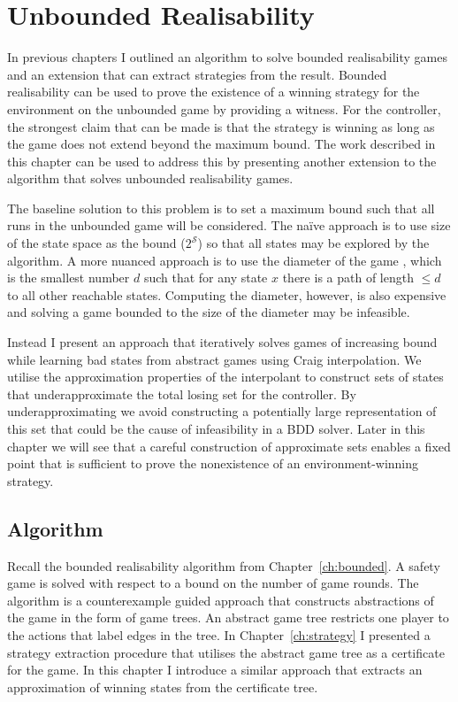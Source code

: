 \chapter{Unbounded Realisability}
\label{ch:unbounded}

\newtheorem*{exmpInt}{Example: Why we use interpolants}

In previous chapters I outlined an algorithm to solve bounded realisability games and an extension that can extract strategies from the result. Bounded realisability can be used to prove the existence of a winning strategy for the environment on the unbounded game by providing a witness. For the controller, the strongest claim that can be made is that the strategy is winning as long as the game does not extend beyond the maximum bound. The work described in this chapter can be used to address this by presenting another extension to the algorithm that solves unbounded realisability games.

The baseline solution to this problem is to set a maximum bound such that all runs in the unbounded game will be considered. The na\"ive approach is to use size of the state space as the bound ($2^\mathcal{S}$) so that all states may be explored by the algorithm. A more nuanced approach is to use the diameter of the game \cite{Biere99}, which is the smallest number $d$ such that for any state $x$ there is a path of length $\leq d$ to all other reachable states. Computing the diameter, however, is also expensive and solving a game bounded to the size of the diameter may be infeasible.

Instead I present an approach that iteratively solves games of increasing
bound while learning bad states from abstract games using Craig interpolation. We utilise the approximation properties of the interpolant to construct sets of states that underapproximate the total losing set for the controller. By underapproximating we avoid constructing a potentially large representation of this set that could be the cause of infeasibility in a BDD solver. Later in this chapter we will see that a careful construction of approximate sets enables a fixed point that is sufficient to prove the nonexistence of an environment-winning strategy.

\section{Algorithm}
\label{sec:unboundedAlgorithm}

Recall the bounded realisability algorithm from Chapter~\ref{ch:bounded}. A safety game is solved with respect to a bound on the number of game rounds. The algorithm is a counterexample guided approach that constructs abstractions of the game in the form of game trees. An abstract game tree restricts one player to the actions that label edges in the tree. In Chapter~\ref{ch:strategy} I presented a strategy extraction procedure that utilises the abstract game tree as a certificate for the game. In this chapter I introduce a similar approach that extracts an approximation of winning states from the certificate tree.

